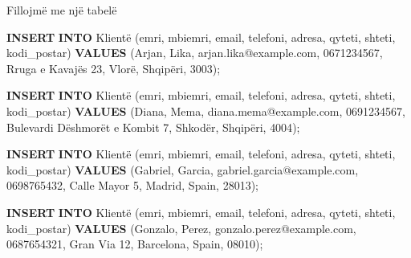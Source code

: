 \documentclass[
  ignorenonframetext,
]{beamer}
\newenvironment{Shaded}{\begin{snugshade}}{\end{snugshade}}
\newcommand{\KeywordTok}[1]{\textcolor[rgb]{0.13,0.29,0.53}{\textbf{#1}}}
\newcommand{\NormalTok}[1]{#1}
\newcommand{\StringTok}[1]{\textcolor[rgb]{0.31,0.60,0.02}{#1}}
\begin{document}
\begin{frame}[fragile]{Fillojmë me një tabelë}
\begin{Shaded}
\begin{Highlighting}[]
\KeywordTok{INSERT} \KeywordTok{INTO}\NormalTok{ Klientë (emri, mbiemri, email, telefoni, adresa, qyteti, shteti, kodi\_postar)}
\KeywordTok{VALUES}\NormalTok{ (}\StringTok{\textquotesingle{}Arjan\textquotesingle{}}\NormalTok{, }\StringTok{\textquotesingle{}Lika\textquotesingle{}}\NormalTok{, }\StringTok{\textquotesingle{}arjan.lika@example.com\textquotesingle{}}\NormalTok{, }\StringTok{\textquotesingle{}0671234567\textquotesingle{}}\NormalTok{, }\StringTok{\textquotesingle{}Rruga e Kavajës 23\textquotesingle{}}\NormalTok{, }\StringTok{\textquotesingle{}Vlorë\textquotesingle{}}\NormalTok{, }\StringTok{\textquotesingle{}Shqipëri\textquotesingle{}}\NormalTok{, }\StringTok{\textquotesingle{}3003\textquotesingle{}}\NormalTok{);}

\KeywordTok{INSERT} \KeywordTok{INTO}\NormalTok{ Klientë (emri, mbiemri, email, telefoni, adresa, qyteti, shteti, kodi\_postar)}
\KeywordTok{VALUES}\NormalTok{ (}\StringTok{\textquotesingle{}Diana\textquotesingle{}}\NormalTok{, }\StringTok{\textquotesingle{}Mema\textquotesingle{}}\NormalTok{, }\StringTok{\textquotesingle{}diana.mema@example.com\textquotesingle{}}\NormalTok{, }\StringTok{\textquotesingle{}0691234567\textquotesingle{}}\NormalTok{, }\StringTok{\textquotesingle{}Bulevardi Dëshmorët e Kombit 7\textquotesingle{}}\NormalTok{, }\StringTok{\textquotesingle{}Shkodër\textquotesingle{}}\NormalTok{, }\StringTok{\textquotesingle{}Shqipëri\textquotesingle{}}\NormalTok{, }\StringTok{\textquotesingle{}4004\textquotesingle{}}\NormalTok{);}

\KeywordTok{INSERT} \KeywordTok{INTO}\NormalTok{ Klientë (emri, mbiemri, email, telefoni, adresa, qyteti, shteti, kodi\_postar)}
\KeywordTok{VALUES}\NormalTok{ (}\StringTok{\textquotesingle{}Gabriel\textquotesingle{}}\NormalTok{, }\StringTok{\textquotesingle{}Garcia\textquotesingle{}}\NormalTok{, }\StringTok{\textquotesingle{}gabriel.garcia@example.com\textquotesingle{}}\NormalTok{, }\StringTok{\textquotesingle{}0698765432\textquotesingle{}}\NormalTok{, }\StringTok{\textquotesingle{}Calle Mayor 5\textquotesingle{}}\NormalTok{, }\StringTok{\textquotesingle{}Madrid\textquotesingle{}}\NormalTok{, }\StringTok{\textquotesingle{}Spain\textquotesingle{}}\NormalTok{, }\StringTok{\textquotesingle{}28013\textquotesingle{}}\NormalTok{);}

\KeywordTok{INSERT} \KeywordTok{INTO}\NormalTok{ Klientë (emri, mbiemri, email, telefoni, adresa, qyteti, shteti, kodi\_postar)}
\KeywordTok{VALUES}\NormalTok{ (}\StringTok{\textquotesingle{}Gonzalo\textquotesingle{}}\NormalTok{, }\StringTok{\textquotesingle{}Perez\textquotesingle{}}\NormalTok{, }\StringTok{\textquotesingle{}gonzalo.perez@example.com\textquotesingle{}}\NormalTok{, }\StringTok{\textquotesingle{}0687654321\textquotesingle{}}\NormalTok{, }\StringTok{\textquotesingle{}Gran Via 12\textquotesingle{}}\NormalTok{, }\StringTok{\textquotesingle{}Barcelona\textquotesingle{}}\NormalTok{, }\StringTok{\textquotesingle{}Spain\textquotesingle{}}\NormalTok{, }\StringTok{\textquotesingle{}08010\textquotesingle{}}\NormalTok{);}


\end{Highlighting}
\end{Shaded}
\end{frame}
\end{document}
